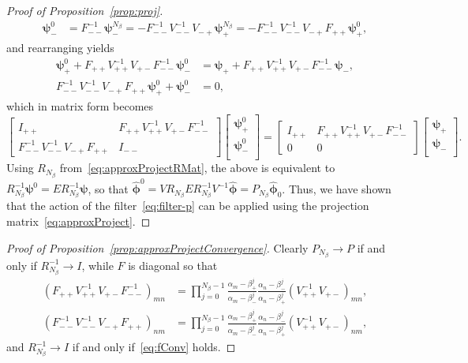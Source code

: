 \begin{proof}[Proof of Proposition~\ref{prop:proj}]
\begin{align*}
        \bm{\psi}_-^0
        &=F_{--}^{-1}\bm{\psi}_-^{ N_\beta}
        =-F_{--}^{-1}V_{--}^{-1}V_{-+}\bm{\psi}_+^{ N_\beta}
        =-F_{--}^{-1}V_{--}^{-1}V_{-+}F_{++}\bm{\psi}_+^0,
    \end{align*}
    and rearranging yields
    \begin{align*}
        \bm{\psi}_+^{0}+F_{++}V_{++}^{-1}V_{+-}F_{--}^{-1}\bm{\psi}_-^0
        &=\bm{\psi}_{+}+F_{++}V_{++}^{-1}V_{+-}F_{--}^{-1}\bm{\psi}_-,\\
        F_{--}^{-1}V_{--}^{-1}V_{-+}F_{++}\bm{\psi}_+^0+\bm{\psi}_-^{0}&=0,
    \end{align*}
    which in matrix form becomes
    \[
    \begin{bmatrix}
        I_{++}                             & F_{++}V_{++}^{-1}V_{+-}F_{--}^{-1}\\
        F_{--}^{-1}V_{--}^{-1}V_{-+}F_{++} & I_{--}
    \end{bmatrix}
    \begin{bmatrix}
        \bm{\psi}_+^0\\
        \bm{\psi}_-^0\\
    \end{bmatrix}
    =
    \begin{bmatrix}
        I_{++} & F_{++}V_{++}^{-1}V_{+-}F_{--}^{-1}\\
        0      & 0
    \end{bmatrix}
    \begin{bmatrix}
        \bm{\psi}_+\\
        \bm{\psi}_-\\
    \end{bmatrix}.
    \]
    Using $R_{N_\beta}$ from~\eqref{eq:approxProjectRMat}, the above is equivalent to $R_{N_\beta}^{-1}\bm{\psi}^{0}=ER_{N_\beta}^{-1}\bm{\psi}$, so that $\hat{\bm{\phi}}^{0}=VR_{N_\beta}ER_{N_\beta}^{-1}V^{-1}\hat{\bm{\phi}} = P_{N_\beta}\hat{\bm{\phi}}_0$. Thus, we have shown that the action of the filter~\eqref{eq:filter-p} can be applied using the projection matrix~\eqref{eq:approxProject}.
\end{proof}

\begin{proof}[Proof of Proposition~\ref{prop:approxProjectConvergence}]
    Clearly $P_{N_\beta}\to P$ if and only if $R_{N_\beta}^{-1}\to I$, while $F$ is diagonal so that
    \begin{align*}
    (F_{++}V_{++}^{-1}V_{+-}F_{--}^{-1})_{mn}
    &=
    \prod_{j=0}^{N_\beta-1}\frac{\alpha_m-\beta_{+}^{j}}{\alpha_m-\beta_-^j}\frac{\alpha_n-\beta_{-}^{j}}{\alpha_n-\beta_+^j}
    (V_{++}^{-1}V_{+-})_{mn},\\
    (F_{--}^{-1}V_{--}^{-1}V_{-+}F_{++})_{nm}
    &=
    \prod_{j=0}^{N_\beta-1}\frac{\alpha_m-\beta_{+}^{j}}{\alpha_m-\beta_-^j}\frac{\alpha_n-\beta_{-}^{j}}{\alpha_n-\beta_+^j}
    (V_{++}^{-1}V_{+-})_{nm},
    \end{align*}    
    and $R_{N_\beta}^{-1}\to I$ if and only if~\eqref{eq:fConv} holds.
\end{proof}

